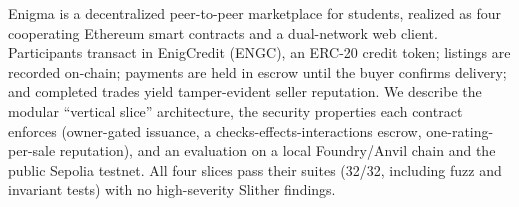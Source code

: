 Enigma is a decentralized peer-to-peer marketplace for students, realized as four cooperating Ethereum smart contracts and a dual-network web client. Participants transact in EnigCredit (ENGC), an ERC-20 credit token; listings are recorded on-chain; payments are held in escrow until the buyer confirms delivery; and completed trades yield tamper-evident seller reputation. We describe the modular ``vertical slice'' architecture, the security properties each contract enforces (owner-gated issuance, a checks-effects-interactions escrow, one-rating-per-sale reputation), and an evaluation on a local Foundry/Anvil chain and the public Sepolia testnet. All four slices pass their suites (32/32, including fuzz and invariant tests) with no high-severity Slither findings.
